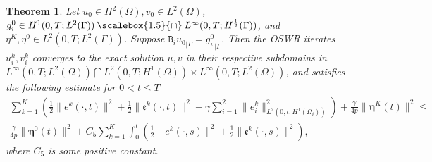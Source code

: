 \documentclass[11pt]{article}
\newcommand*{\medcap}{\mathbin{\scalebox{1.5}{\ensuremath{\cap}}}}
\newtheorem{theorem}{Theorem}[section]
\begin{document}
\begin{theorem}\label{OSWR_thm_conv}
Let $u_0\in H^2(\Omega), v_0\in L^2(\Omega)$, $g_i^{0}\in H^1(0, T;L^2(\Gamma))\medcap L^{\infty}(0, T;H^{\frac{1}{2}}(\Gamma))$, and $\eta^K,  \eta^0 \in L^2(0, T; L^2(\Gamma))$. Suppose ${\mathtt{B}_iu_0}_{|\Gamma}={g_i^{0}}_{|\Gamma}$. Then the OSWR iterates $u_i^{k}, v_i^{k}$ converges to the exact solution $u, v$ in their respective subdomains in $L^{\infty}(0,T;L^2(\Omega))\bigcap L^2(0,T;H^1(\Omega))\times L^{\infty}(0,T;L^2(\Omega))$, and satisfies the following estimate for $0<t\leq T$
\begin{multline}\label{OSWR_est}
 \sum_{k=1}^K  \left( \frac{1}{2}\parallel {e}^{k}(\cdot,t)\parallel^2 + \frac{1}{2}\parallel \mathfrak{e}^{k}(\cdot, t)\parallel^2 +\gamma\sum_{i=1}^2 \parallel {e}_i^{k}\parallel_{L^2(0,t;H^1(\Omega_i))}^2\right) +\frac{\gamma}{4p} \parallel\boldsymbol{\eta}^{K}(t)\parallel^2 \leq \\ \frac{\gamma}{4p} \parallel\boldsymbol{\eta}^{0}(t)\parallel^2 + C_5\sum_{k=1}^K \int_0^t  \left( \frac{1}{2}\parallel {e}^{k}(\cdot,s)\parallel^2 + \frac{1}{2}\parallel \mathfrak{e}^{k}(\cdot, s)\parallel^2 \right), 
\end{multline}
where $C_5$ is some positive constant.
\end{theorem}
\end{document}
